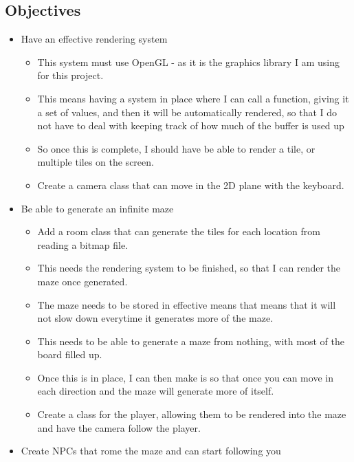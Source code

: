 \documentclass[../Main.tex]{subfiles}
\begin{document}
    \subsection{Objectives}
        \begin{itemize}
            \item Have an effective rendering system
                \begin{itemize}
                    \item This system must use OpenGL - as it is the graphics library I am using for this project.
                    \item This means having a system in place where I can call a function, giving it a set of values, and then it will be automatically rendered, so that I do not have to deal with keeping track of how much of the buffer is used up
                    \item So once this is complete, I should have be able to render a tile, or multiple tiles on the screen.
                    \item Create a camera class that can move in the 2D plane with the keyboard.
                \end{itemize}
            \item Be able to generate an infinite maze
                \begin{itemize}
                    \item Add a room class that can generate the tiles for each location from reading a bitmap file.
                    \item This needs the rendering system to be finished, so that I can render the maze once generated.
                    \item The maze needs to be stored in effective means that means that it will not slow down everytime it generates more of the maze.
                    \item This needs to be able to generate a maze from nothing, with most of the board filled up.
                    \item Once this is in place, I can then make is so that once you can move in each direction and the maze will generate more of itself.
                    \item Create a class for the player, allowing them to be rendered into the maze and have the camera follow the player.
                \end{itemize}
            \item Create NPCs that rome the maze and can start following you

\end{itemize}
\end{document}
